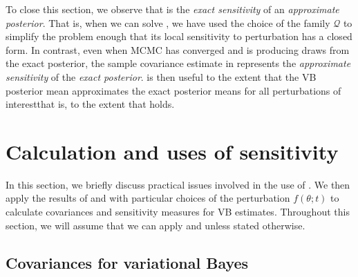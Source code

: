 \documentclass{article}\usepackage[]{graphicx}\usepackage[]{color}
\theoremstyle{plain}
\theoremstyle{definition}
\theoremstyle{plain}
\theoremstyle{plain}
\theoremstyle{plain}
\theoremstyle{plain}
\begin{document}
To close this section, we observe that 
is the \textit{exact sensitivity} of an \textit{approximate posterior}.
That is, when we can solve , we have
used the choice of the family $\mathcal{Q}$ to simplify the problem
enough that its local sensitivity to perturbation has a closed form.
In contrast, even when MCMC has converged and is producing draws from
the exact posterior, the sample covariance estimate in 
represents the \textit{approximate sensitivity} of the \textit{exact
posterior}.  is then useful to the extent
that the VB posterior mean approximates the exact posterior means
for all perturbations of interest\textemdash that is, to the extent
that  holds.

\section{Calculation and uses of sensitivity\label{sec:sensitivity_in_action}}

In this section, we briefly discuss practical issues involved in the
use of . We then apply the results of
 and  with particular
choices of the perturbation $f\left(\theta;t\right)$ to calculate
covariances and sensitivity measures for VB estimates. Throughout
this section, we will assume that we can apply 
and  unless stated otherwise.

\subsection{Covariances for variational Bayes\label{subsec:lrvb_cov}}
\end{document}
